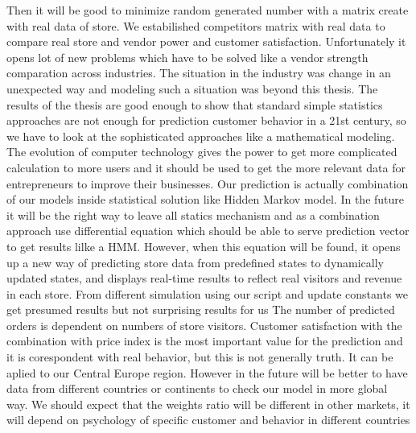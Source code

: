 Then it will be good to minimize random generated number with a matrix create with real data of store.
We estabilished competitors matrix with real data to compare real store and vendor power and customer satisfaction.
Unfortunately it opens lot of new problems which have to be solved like a vendor strength comparation across industries.
The situation in the industry was change in an unexpected way and modeling such a situation was beyond this thesis.
The results of the thesis are good enough to show that standard simple statistics approaches are not enough for prediction customer behavior in a 21st century, so we have to look at the sophisticated approaches like a mathematical modeling.
The evolution of computer technology gives the power to get more complicated calculation to more users and it should be used to get the more relevant data for entrepreneurs to improve their businesses.
Our prediction is actually combination of our models inside statistical solution like Hidden Markov model.
In the future it will be the right way to leave all statics mechanism and as a combination approach use differential equation which should be able to serve prediction vector to get results lilke a HMM.
However, when this equation will be found, it opens up a new way of predicting store data from predefined states to dynamically updated states, and displays real-time results to reflect real visitors and revenue in each store.
From different simulation using our script and update constants we get presumed results but not surprising results for us
The number of predicted orders is dependent on numbers of store visitors.
Customer satisfaction with the combination with price index is the most important value for the prediction and it is corespondent with real behavior, but this is not generally truth.
It can be aplied to our Central Europe region.
However in the future will be better to have data from different countries or continents to check our model in more global way.
We should expect that the weights ratio will be different in other markets, it will depend on psychology of specific customer and behavior in different countries
